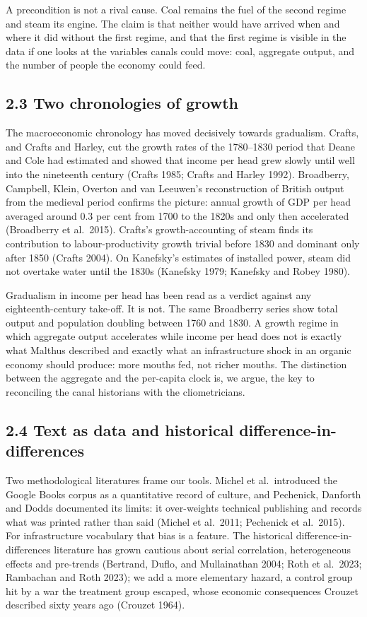 \documentclass[
  11pt,
]{article}
\begin{document}
A precondition is not a rival cause. Coal remains the fuel of the second
regime and steam its engine. The claim is that neither would have
arrived when and where it did without the first regime, and that the
first regime is visible in the data if one looks at the variables canals
could move: coal, aggregate output, and the number of people the economy
could feed.

\subsection{2.3 Two chronologies of
growth}\label{two-chronologies-of-growth}

The macroeconomic chronology has moved decisively towards gradualism.
Crafts, and Crafts and Harley, cut the growth rates of the 1780--1830
period that Deane and Cole had estimated and showed that income per head
grew slowly until well into the nineteenth century (Crafts 1985; Crafts
and Harley 1992). Broadberry, Campbell, Klein, Overton and van Leeuwen's
reconstruction of British output from the medieval period confirms the
picture: annual growth of GDP per head averaged around 0.3 per cent from
1700 to the 1820s and only then accelerated (Broadberry et al.~2015).
Crafts's growth-accounting of steam finds its contribution to
labour-productivity growth trivial before 1830 and dominant only after
1850 (Crafts 2004). On Kanefsky's estimates of installed power, steam
did not overtake water until the 1830s (Kanefsky 1979; Kanefsky and
Robey 1980).

Gradualism in income per head has been read as a verdict against any
eighteenth-century take-off. It is not. The same Broadberry series show
total output and population doubling between 1760 and 1830. A growth
regime in which aggregate output accelerates while income per head does
not is exactly what Malthus described and exactly what an infrastructure
shock in an organic economy should produce: more mouths fed, not richer
mouths. The distinction between the aggregate and the per-capita clock
is, we argue, the key to reconciling the canal historians with the
cliometricians.

\subsection{2.4 Text as data and historical
difference-in-differences}\label{text-as-data-and-historical-difference-in-differences}

Two methodological literatures frame our tools. Michel et al.~introduced
the Google Books corpus as a quantitative record of culture, and
Pechenick, Danforth and Dodds documented its limits: it over-weights
technical publishing and records what was printed rather than said
(Michel et al.~2011; Pechenick et al.~2015). For infrastructure
vocabulary that bias is a feature. The historical
difference-in-differences literature has grown cautious about serial
correlation, heterogeneous effects and pre-trends (Bertrand, Duflo, and
Mullainathan 2004; Roth et al.~2023; Rambachan and Roth 2023); we add a
more elementary hazard, a control group hit by a war the treatment group
escaped, whose economic consequences Crouzet described sixty years ago
(Crouzet 1964).
\end{document}
